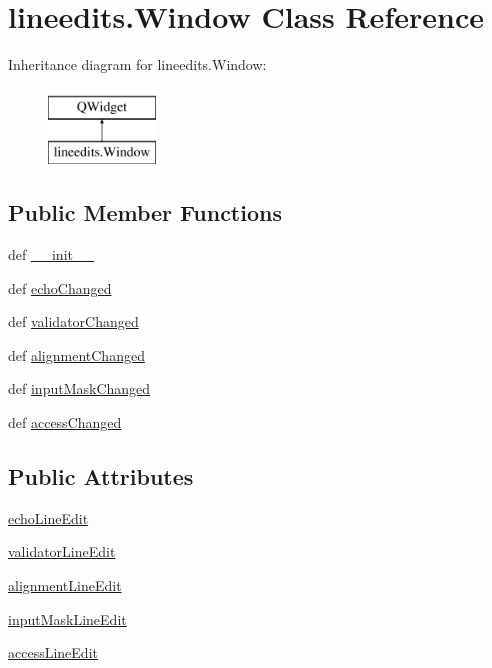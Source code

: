 \hypertarget{classlineedits_1_1Window}{}\section{lineedits.\+Window Class Reference}
\label{classlineedits_1_1Window}
Inheritance diagram for lineedits.\+Window\+:\begin{figure}[H]
\begin{center}
\leavevmode
\includegraphics[height=2.000000cm]{classlineedits_1_1Window}
\end{center}
\end{figure}
\subsection*{Public Member Functions}
\begin{DoxyCompactItemize}
\item 
def \hyperlink{classlineedits_1_1Window_a4dec2fdc5fb57e7be8a69f14a623dbae}{\+\_\+\+\_\+init\+\_\+\+\_\+}
\item 
def \hyperlink{classlineedits_1_1Window_a832724c2873b5f28066e83b92af24e7f}{echo\+Changed}
\item 
def \hyperlink{classlineedits_1_1Window_add8977aee8676d50bc5e57778569931b}{validator\+Changed}
\item 
def \hyperlink{classlineedits_1_1Window_a80cb52d7a7830b89c08bb2c39eb5706e}{alignment\+Changed}
\item 
def \hyperlink{classlineedits_1_1Window_af7618c19d760c1423d6594e19285e5ce}{input\+Mask\+Changed}
\item 
def \hyperlink{classlineedits_1_1Window_aec326828236560a0cd5194725d74bba1}{access\+Changed}
\end{DoxyCompactItemize}
\subsection*{Public Attributes}
\begin{DoxyCompactItemize}
\item 
\hyperlink{classlineedits_1_1Window_af062bae3c049b3a761482052dbd57d8c}{echo\+Line\+Edit}
\item 
\hyperlink{classlineedits_1_1Window_ac529e77541388259c8109483a302c66a}{validator\+Line\+Edit}
\item 
\hyperlink{classlineedits_1_1Window_ad49e2ddc88889922ce4331ef46754a7e}{alignment\+Line\+Edit}
\item 
\hyperlink{classlineedits_1_1Window_aebab66696906007f35998963574ec928}{input\+Mask\+Line\+Edit}
\item 
\hyperlink{classlineedits_1_1Window_a8073ad746208fb1e680431ef219fe542}{access\+Line\+Edit}
\end{DoxyCompactItemize}


